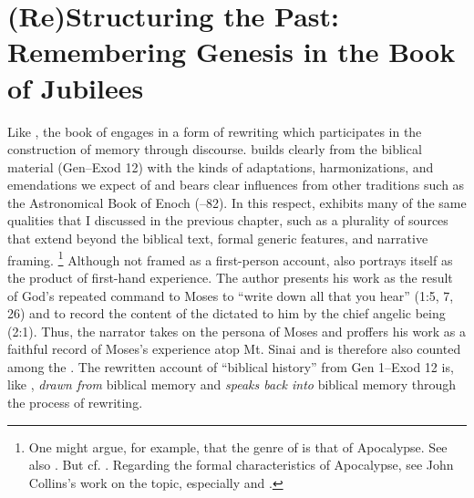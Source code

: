 
\nocite{dillamnn_jbw_kleine}
\nocite{ewald_zkm1844}

\chapter{(Re)Structuring the Past: Remembering Genesis in the Book of Jubilees}
\label{chap:jubilees}

Like \ga, the book of \jub engages in a form of rewriting which participates in the construction of memory through \psgraphical discourse. \jub builds clearly from the biblical material (Gen--Exod 12) with the kinds of adaptations, harmonizations, and emendations we expect of \rwb and bears clear influences from other \secondtemple traditions such as the Astronomical Book of Enoch (--82). In this respect, \jub exhibits many of the same qualities that I discussed in the previous chapter, such as a plurality of sources that extend beyond the biblical text, formal generic features, and narrative framing.%
    \footnote{%
        One might argue, for example, that the genre of \jub is that  of Apocalypse. See also 
        \cite{kugel_dsd1994}. But cf. 
        \cite{hanneken2012}. Regarding the formal characteristics of Apocalypse, see John Collins's work on the topic, especially 
        \cite{collins_mason-etal2012} and 
        \cite{collins_semeia1979}.}
Although not framed as a first-person account, \jub also portrays itself as the product of first-hand experience. The author presents his work as the result of God's repeated command to Moses to ``write down all that you hear'' (1:5, 7, 26) and to record the content of the \heavenlytablets dictated to him by the chief angelic being (2:1). Thus, the narrator takes on the persona of Moses and proffers his work as a faithful record of Moses's experience atop Mt. Sinai and is therefore also counted among the \psa. The rewritten account of ``biblical history'' from Gen 1--Exod 12 is, like \ga, \emph{drawn from} biblical memory and \emph{speaks back into} biblical memory through the process of rewriting. 

